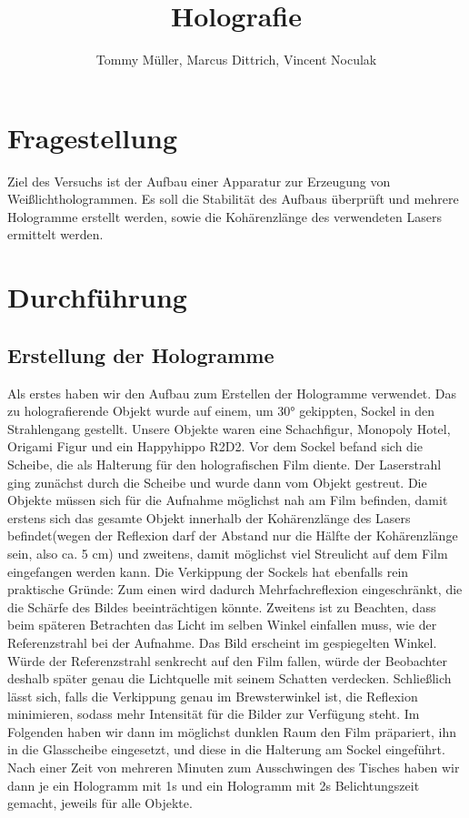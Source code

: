 \documentclass[10pt,a4paper]{article}
\author{Tommy Müller, Marcus Dittrich, Vincent Noculak}
\title{Holografie}
\begin{document}
\section{Fragestellung}

Ziel des Versuchs ist der Aufbau einer Apparatur zur Erzeugung von Weißlichthologrammen. Es soll die Stabilität des Aufbaus überprüft und mehrere Hologramme erstellt werden, sowie die Kohärenzlänge des verwendeten Lasers ermittelt werden.

\section{Durchführung}


\subsection{Erstellung der Hologramme}

Als erstes haben wir den Aufbau zum Erstellen der Hologramme verwendet. Das zu holografierende Objekt wurde auf einem, um 30° gekippten, Sockel in den Strahlengang gestellt. Unsere Objekte waren eine Schachfigur, Monopoly Hotel, Origami Figur und ein Happyhippo R2D2. Vor dem Sockel befand sich die Scheibe, die als Halterung für den holografischen Film diente. 
Der Laserstrahl ging zunächst durch die Scheibe und wurde dann vom Objekt gestreut. Die Objekte müssen sich für die Aufnahme möglichst nah am Film befinden, damit erstens sich das gesamte Objekt innerhalb der Kohärenzlänge des Lasers befindet(wegen der Reflexion darf der Abstand nur die Hälfte der Kohärenzlänge sein, also ca. 5 cm) und zweitens, damit möglichst viel Streulicht auf dem Film eingefangen werden kann. Die Verkippung der Sockels hat ebenfalls rein praktische Gründe: Zum einen wird dadurch Mehrfachreflexion eingeschränkt, die die Schärfe des Bildes beeinträchtigen könnte. Zweitens ist zu Beachten, dass beim späteren Betrachten das Licht im selben Winkel einfallen muss, wie der Referenzstrahl bei der Aufnahme. Das Bild erscheint im gespiegelten Winkel. Würde der Referenzstrahl senkrecht auf den Film fallen, würde der Beobachter deshalb später genau die Lichtquelle mit seinem Schatten verdecken. Schließlich lässt sich, falls die Verkippung genau im Brewsterwinkel ist, die Reflexion minimieren, sodass mehr Intensität für die Bilder zur Verfügung steht. Im Folgenden haben wir dann im möglichst dunklen Raum den Film präpariert, ihn in die Glasscheibe eingesetzt, und diese in die Halterung am Sockel eingeführt. Nach einer Zeit von mehreren Minuten zum Ausschwingen des Tisches haben wir dann je ein Hologramm mit 1s und ein Hologramm mit 2s Belichtungszeit gemacht, jeweils für alle Objekte.
\end{document}
